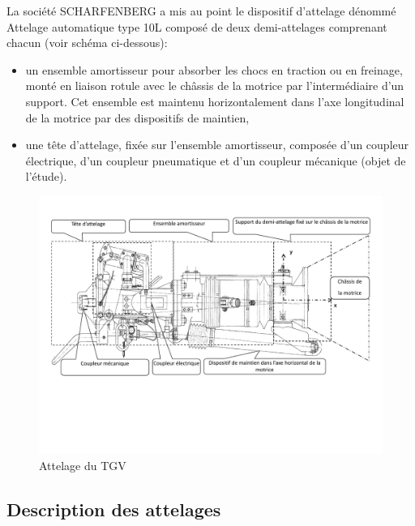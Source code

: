 La société SCHARFENBERG a mis au point le dispositif d'attelage dénommé \og Attelage automatique type 10L \fg composé de deux demi-attelages comprenant chacun (voir schéma ci-dessous):
\begin{itemize}
 \item un ensemble amortisseur pour absorber les chocs en traction ou en freinage, monté en liaison rotule avec le châssis de la motrice par l'intermédiaire d'un support. Cet ensemble est maintenu horizontalement dans l'axe longitudinal de la motrice par des dispositifs de maintien,
 \item une tête d'attelage, fixée sur l'ensemble amortisseur, composée d'un coupleur électrique, d'un coupleur pneumatique et d'un coupleur mécanique (objet de l'étude).
\end{itemize}

\begin{figure}[!h]
\centering\includegraphics[width=0.75\linewidth]{img/Image2.pdf}
 \caption{Attelage du TGV}
 \label{img:image2}
\end{figure}

\subsection{Description des attelages}

